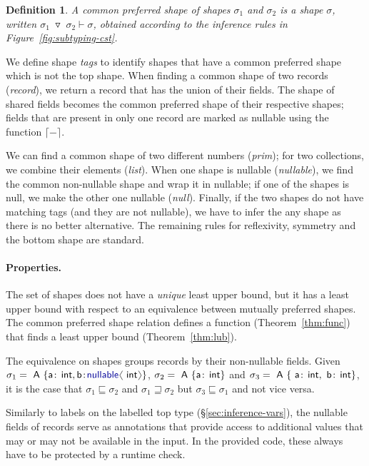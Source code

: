 \documentclass[10pt,preprint,blind,clearpagebib]{sigplanconf}
\newcommand{\langl}{\begin{picture}(4.5,7)
\put(1.1,2.5){\rotatebox{60}{\line(1,0){5.5}}}
\put(1.1,2.5){\rotatebox{300}{\line(1,0){5.5}}}
\end{picture}}
\newcommand{\rangl}{\begin{picture}(4.5,7)
\put(.9,2.5){\rotatebox{120}{\line(1,0){5.5}}}
\put(.9,2.5){\rotatebox{240}{\line(1,0){5.5}}}
\end{picture}}
\newcommand{\kvd}[1]{\textnormal{\textcolor{kvdclr}{\sffamily #1}}}
\newcommand{\ident}[1]{\textnormal{\sffamily #1}}
\newcommand{\tsep}[0]{\; \triangledown \;}
\newcommand{\addopt}[1]{\lceil#1\rceil}
\newtheorem{definition}{Definition}
\begin{document}
\begin{definition}
A \emph{common preferred shape} of shapes $\sigma_1$ and $\sigma_2$ is a shape $\sigma$, written 
$\sigma_1 \tsep \sigma_2 \vdash \sigma$, obtained according to the inference rules in 
Figure~\ref{fig:subtyping-cst}.
\end{definition}

\noindent
We define shape \emph{tags} to identify shapes that have a common preferred shape which is not the
top shape. When finding a common shape of two records (\emph{record}), we return a record that has 
the union of their fields. The shape of shared fields becomes the common preferred shape of their 
respective shapes; fields that are present in only one record are marked as nullable using 
the function $\addopt{-}$.

We can find a common shape of two different numbers (\emph{prim}); for two collections,
we combine their elements (\emph{list}). When one shape is nullable (\emph{nullable}), we find
the common non-nullable shape and wrap it in \kvd{nullable}; if one of the shapes is \kvd{null}, 
we make the other one nullable (\emph{null}). Finally, if the two shapes do not have matching tags 
(and they are not nullable), we have to infer the \kvd{any} shape as there is no better alternative. 
The remaining rules for reflexivity, symmetry and the bottom shape are standard.

\paragraph{Properties.}
The set of shapes does not have a \emph{unique} least upper bound, but it 
has a least upper bound with respect to an equivalence between mutually preferred shapes. 
The common preferred shape relation defines a function (Theorem~\ref{thm:func}) that finds a
least upper bound (Theorem~\ref{thm:lub}). 

The equivalence on shapes groups records by their non-nullable fields. Given 
$\sigma_1 = \ident{A}~\{ \ident{a}\!:\!\ident{int}, \ident{b}\!:\!\kvd{nullable}\langl\ident{int}\rangl \}$,
$\sigma_2 = \ident{A}~\{ \ident{a}\!:\!\ident{int} \}$ and
$\sigma_3 = \ident{A}~\{ \ident{a}\!:\!\ident{int}, \ident{b}\!:\!\ident{int} \}$,
it is the case that $\sigma_1 \sqsubseteq \sigma_2$ and $\sigma_1 \sqsupseteq \sigma_2$ but
$\sigma_3 \sqsubseteq \sigma_1$ and not vice versa. 

Similarly to labels on the labelled top type (\S\ref{sec:inference-vars}), the nullable fields 
of records serve as annotations that provide access to additional values that may or may not be 
available in the input. In the provided code, these always have to be protected by a runtime check.
\end{document}
